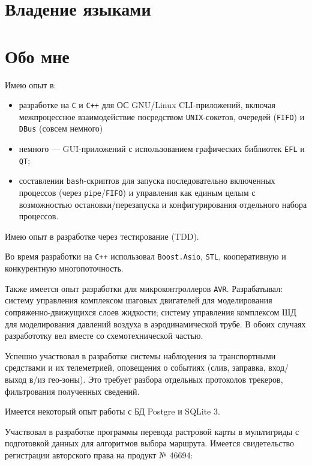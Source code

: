 \documentclass[11pt,a4paper,russian]{moderncv}
\begin{document}
\section{Владение языками}

\section{Обо мне}
\par{Имею опыт в:}
\begin{itemize}
\item разработке на \texttt{C} и \texttt{C++} для ОС GNU/Linux CLI-приложений, включая межпроцессное взаимодействие посредством \texttt{UNIX}-сокетов, очередей (\texttt{FIFO}) и \texttt{DBus} (совсем немного)
\item немного --- GUI-приложений с использованием графических библиотек \texttt{EFL} и \texttt{QT};
\item составлении \texttt{bash}-скриптов для запуска последовательно включенных процессов (через \texttt{pipe}/\texttt{FIFO}) и управления как единым целым с возможностью остановки/перезапуска и конфигурирования отдельного набора процессов.
\end{itemize}
\par{Имею опыт в разработке через тестирование (TDD).}
\par{Во время разработки на \texttt{C++} использовал \texttt{Boost.Asio}, \texttt{STL}, кооперативную и конкурентную многопоточность.}
\par{Также имеется опыт разработки для микроконтроллеров \texttt{AVR}. Разрабатывал: систему управления комплексом шаговых двигателей для моделирования сопряженно-движущихся слоев жидкости; систему управления комплексом ШД для моделирования давлений воздуха в аэродинамической трубе. В обоих случаях разработотку вел вместе со схемотехнической частью.}
\par{Успешно участвовал в разработке системы наблюдения за транспортными средствами и их телеметрией, оповещения о событиях (слив, заправка, вход/выход в/из гео-зоны). Это требует разбора отдельных протоколов трекеров, фильтрования полученных сведений.}
\par{Имеется некоторый опыт работы с БД Postgre и SQLite 3.}
\par{Участвовал в разработке программы перевода растровой карты в мультигриды с подготовкой данных для алгоритмов выбора маршрута. Имеется свидетельство регистрации авторского права на продукт № 46694:}
\end{document}

